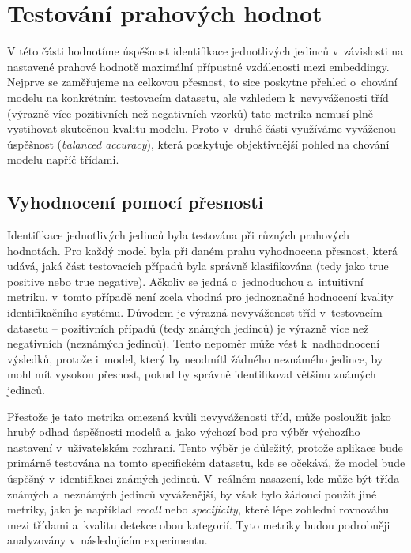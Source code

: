 \section{Testování prahových hodnot}
\label{threshold}
V této části hodnotíme úspěšnost identifikace jednotlivých jedinců v~závislosti na nastavené prahové hodnotě maximální přípustné vzdálenosti mezi embeddingy. Nejprve se zaměřujeme na celkovou přesnost, to sice poskytne přehled o~chování modelu na konkrétním testovacím datasetu, ale vzhledem k~nevyváženosti tříd (výrazně více pozitivních než negativních vzorků) tato metrika nemusí plně vystihovat skutečnou kvalitu modelu. Proto v~druhé části využíváme vyváženou úspěšnost (\textit{balanced accuracy}), která poskytuje objektivnější pohled na chování modelu napříč třídami.

\subsection*{Vyhodnocení pomocí přesnosti}
\label{bestModel}
Identifikace jednotlivých jedinců byla testována při různých prahových hodnotách. Pro každý model byla při daném prahu vyhodnocena přesnost, která udává, jaká část testovacích případů byla správně klasifikována (tedy jako true positive nebo true negative). Ačkoliv se jedná o~jednoduchou a~intuitivní metriku, v~tomto případě není zcela vhodná pro jednoznačné hodnocení kvality identifikačního systému. Důvodem je výrazná nevyváženost tříd v~testovacím datasetu -- pozitivních případů (tedy známých jedinců) je výrazně více než negativních (neznámých jedinců). Tento nepoměr může vést k~nadhodnocení výsledků, protože i~model, který by neodmítl žádného neznámého jedince, by mohl mít vysokou přesnost, pokud by správně identifikoval většinu známých jedinců.

Přestože je tato metrika omezená kvůli nevyváženosti tříd, může posloužit jako hrubý odhad úspěšnosti modelů a~jako výchozí bod pro výběr výchozího nastavení v~uživatelském rozhraní. Tento výběr je důležitý, protože aplikace bude primárně testována na tomto specifickém datasetu, kde se očekává, že model bude úspěšný v~identifikaci známých jedinců. V~reálném nasazení, kde může být třída známých a~neznámých jedinců vyváženější, by však bylo žádoucí použít jiné metriky, jako je například \textit{recall} nebo \textit{specificity}, které lépe zohlední rovnováhu mezi třídami a~kvalitu detekce obou kategorií. Tyto metriky budou podrobněji analyzovány v~následujícím experimentu.

